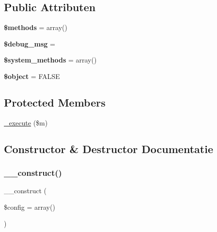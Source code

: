 \subsection*{Public Attributen}
\begin{DoxyCompactItemize}
\item 
\mbox{\label{class_c_i___xmlrpcs_a802753499268a04da139bd6e6ef89b35}} 
{\bfseries \$methods} = array()
\item 
\mbox{\label{class_c_i___xmlrpcs_afed2f9c39f2e406bcdff222ce412bda8}} 
{\bfseries \$debug\+\_\+msg} = \textquotesingle{}\textquotesingle{}
\item 
\mbox{\label{class_c_i___xmlrpcs_a07c837152d76c5e72b0bd7a065fa9c10}} 
{\bfseries \$system\+\_\+methods} = array()
\item 
\mbox{\label{class_c_i___xmlrpcs_a52123b83a1952a68c5513e47d59ec4a6}} 
{\bfseries \$object} = F\+A\+L\+SE
\end{DoxyCompactItemize}
\subsection*{Protected Members}
\begin{DoxyCompactItemize}
\item 
\mbox{\hyperlink{class_c_i___xmlrpcs_a2f039adb8ec59c693300993c95138b46}{\+\_\+execute}} (\$m)
\end{DoxyCompactItemize}


\subsection{Constructor \& Destructor Documentatie}
\mbox{\label{class_c_i___xmlrpcs_af7f9493844d2d66e924e3c1df51ce616}} 
\subsubsection{\texorpdfstring{\_\_construct()}{\_\_construct()}}
{\footnotesize\ttfamily \+\_\+\+\_\+construct (\begin{DoxyParamCaption}\item[{}]{\$config = {\ttfamily array()} }\end{DoxyParamCaption})}

